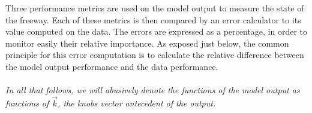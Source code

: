 Three performance metrics are used on the model output to measure the state of the freeway. Each of these metrics is then compared by an error calculator to its value computed on the data.
The errors are expressed as a percentage, in order to monitor easily their relative importance. As exposed just below, the common principle for this error computation is to calculate the relative difference between the model output performance and the data performance.\\
\\
\emph{In all that follows, we will abusively denote the functions of the model output as functions of $\vec{k}$, the knobs vector antecedent of the output.}\\